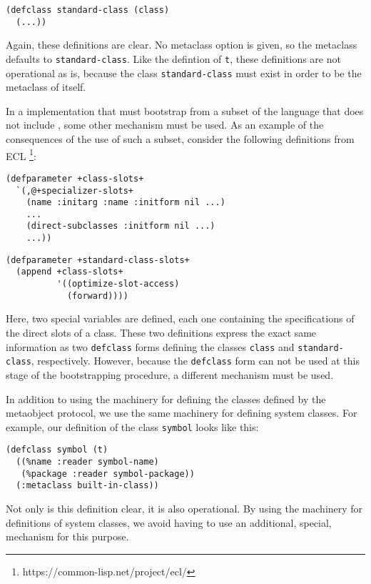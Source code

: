 \begin{verbatim}
(defclass standard-class (class)
  (...))
\end{verbatim}

\noindent
Again, these definitions are clear.  No metaclass option is given, so
the metaclass defaults to \texttt{standard-class}.  Like the defintion
of \texttt{t}, these definitions are not operational as is, because
the class \texttt{standard-class} must exist in order to be the
metaclass of itself.

In a \commonlisp{} implementation that must bootstrap \clos{} from a
subset of the language that does not include \clos{}, some other
mechanism must be used.  As an example of the consequences of the use
of such a subset, consider the following definitions from ECL%
\footnote{https://common-lisp.net/project/ecl/}:

\begin{verbatim}
(defparameter +class-slots+
  `(,@+specializer-slots+
    (name :initarg :name :initform nil ...)
    ...
    (direct-subclasses :initform nil ...)
    ...))
\end{verbatim}

\begin{verbatim}
(defparameter +standard-class-slots+
  (append +class-slots+
          '((optimize-slot-access)
            (forward))))
\end{verbatim}

\noindent
Here, two special variables are defined, each one containing the
specifications of the direct slots of a class.  These two definitions
express the exact same information as two \texttt{defclass} forms
defining the classes \texttt{class} and \texttt{standard-class},
respectively.  However, because the \texttt{defclass} form can not be
used at this stage of the bootstrapping procedure, a different mechanism
must be used.

In addition to using the \clos{} machinery for defining the classes
defined by the metaobject protocol, we use the same machinery for
defining system classes.  For example, our definition of the class
\texttt{symbol} looks like this:

\begin{verbatim}
(defclass symbol (t)
  ((%name :reader symbol-name)
   (%package :reader symbol-package))
  (:metaclass built-in-class))
\end{verbatim}

\noindent
Not only is this definition clear, it is also operational.  By using
the \clos{} machinery for definitions of system classes, we avoid
having to use an additional, special, mechanism for this purpose.


